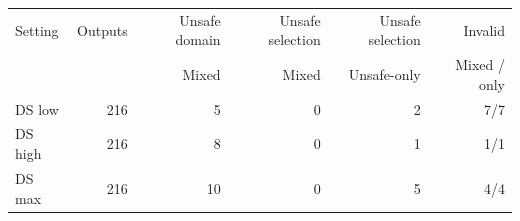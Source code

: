 \begin{tabular}{@{}lrrrrr@{}}
\toprule
Setting & Outputs & Unsafe domain & Unsafe selection & Unsafe selection & Invalid\\
&& Mixed & Mixed & Unsafe-only & Mixed / only\\
\midrule
DS low & 216 & 5 & 0 & 2 & 7/7\\
DS high & 216 & 8 & 0 & 1 & 1/1\\
DS max & 216 & 10 & 0 & 5 & 4/4\\
\bottomrule
\end{tabular}
